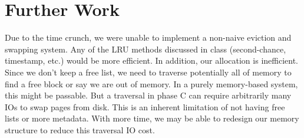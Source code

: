 \documentclass{article}
\begin{document}
\section{Further Work}
Due to the time crunch, we were unable to implement a non-naive eviction and swapping system. Any of the LRU methods discussed in class (second-chance, timestamp, etc.) would be more efficient. In addition, our allocation is inefficient. Since we don't keep a free list, we need to traverse potentially all of memory to find a free block or say we are out of memory. In a purely memory-based system, this might be passable. But a traversal in phase C can require arbitrarily many IOs to swap pages from disk. This is an inherent limitation of not having free lists or more metadata. With more time, we may be able to redesign our memory structure to reduce this traversal IO cost.
\end{document}
